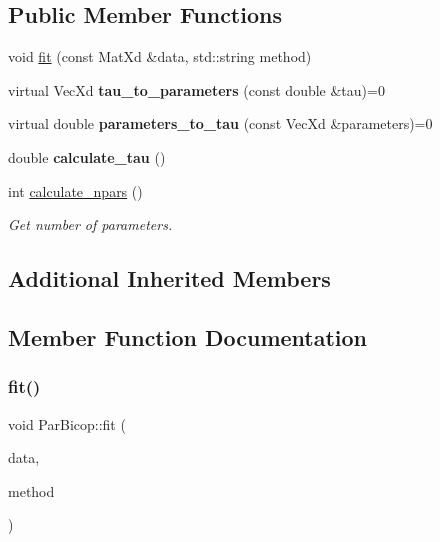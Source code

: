\subsection*{Public Member Functions}
\begin{DoxyCompactItemize}
\item 
void \hyperlink{class_par_bicop_aeab5e7031792bebc04a401a8f135d3a0}{fit} (const Mat\+Xd \&data, std\+::string method)
\item 
\mbox{\label{class_par_bicop_ae7a6435fa4df9989d38fcbec9666218a}} 
virtual Vec\+Xd {\bfseries tau\+\_\+to\+\_\+parameters} (const double \&tau)=0
\item 
\mbox{\label{class_par_bicop_afa2abb9e5c96798e4c06e79111bb6314}} 
virtual double {\bfseries parameters\+\_\+to\+\_\+tau} (const Vec\+Xd \&parameters)=0
\item 
\mbox{\label{class_par_bicop_af866faf5a92ad12582b50192a033a39c}} 
double {\bfseries calculate\+\_\+tau} ()
\item 
\mbox{\label{class_par_bicop_ade5b88a9bf7f9e6b9d75228a8db146ee}} 
int \hyperlink{class_par_bicop_ade5b88a9bf7f9e6b9d75228a8db146ee}{calculate\+\_\+npars} ()
\begin{DoxyCompactList}\small\item\em Get number of parameters. \end{DoxyCompactList}\end{DoxyCompactItemize}
\subsection*{Additional Inherited Members}


\subsection{Member Function Documentation}
\mbox{\label{class_par_bicop_aeab5e7031792bebc04a401a8f135d3a0}} 
\subsubsection{\texorpdfstring{fit()}{fit()}}
{\footnotesize\ttfamily void Par\+Bicop\+::fit (\begin{DoxyParamCaption}\item[{const Mat\+Xd \&}]{data,  }\item[{std\+::string}]{method }\end{DoxyParamCaption})\hspace{0.3cm}{\ttfamily [virtual]}}

